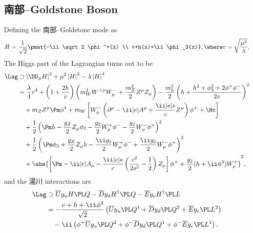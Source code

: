 \subsection{南部--Goldstone Boson}
Defining the 南部--Goldstone mode as
\begin{equation}
 H = \frac1{\sqrt2}\pmat{-\ii \sqrt2 \phi^+(x) \\ v+h(x)+\ii\phi_3(x)}, \where v=\sqrt{\frac{\mu^2}{\lambda}},
\end{equation}
The Higgs part of the Lagrangian turns out to be
\begin{align}\begin{split}
 \Lag&\supset \left|\DD_\mu H\right|^2 + \mu^2\left|H\right|^2 - \lambda\left|H\right|^4\\
&=
\frac{\lambda}{4}v^4+ \left(1+\frac{2h}{v}\right)\left(m_W^2 W^{+\mu}W^-_\mu + \frac{m_Z^2}2Z^\mu Z_\mu\right)
 -
\frac{m_h^2}{2}\left(h+\frac{h^2+\phi_3^2+2\phi^+\phi^-}{2v}\right)^2
\\&\quad
+m_Z Z^\mu\Pm\phi^3
+m_W
\left[
W^-_\mu\left(
\partial^\mu
-\ii|e|A^\mu+\frac{\ii|e|s}{c}Z^\mu
\right)\phi^+
+\Hc\right]
\\&\quad
+\frac12\left(\Pm h-\frac{g_Z}2 Z_\mu\phi_3-\frac{g_2}{2} W_\mu^+\phi^- -\frac{g_2}{2} W_\mu^-\phi^+\right)^2
\\&\quad
+
\frac12\left(\Pm\phi_3+\frac{g_Z}2 Z_\mu h -\frac{\ii g_2}{2}W_\mu^+\phi^- +\frac{\ii g_2}{2}W_\mu^-\phi^+\right)^2
\\&\quad
+\abs{\left[\Pm-\ii|e|A_\mu -\frac{\ii|e|s}{c}\left(\frac{c^2}{2s^2}-\frac12\right)
 Z_\mu\right]\phi^+ + \frac{g_2}{2}(h+\ii\phi^3) W^+_\mu}^2,
\end{split}
\end{align}
and the 湯川 interactions are
\begin{align}
\begin{split}
  \Lag&\supset
 \overline U y_uH\PL Q - \overline D y_dH^\dagger\PL Q - \overline E y_eH^\dagger\PL L
 \\&
 =-\frac{v+h+\ii\phi^3}{\sqrt2}\left(
   \overline U y_u\PL Q^1
 + \overline D y_d\PL Q^2
 + \overline E y_e\PL L^2
 \right)
\\&\quad
 -\ii
 \left(
 \phi^+ \overline Uy_u\PL Q^2+\phi^-\overline D y_d\PL Q^1+\phi^-\overline Ey_e\PL L^1
 \right).
\end{split}
\end{align}


